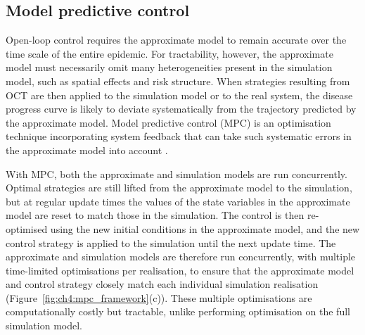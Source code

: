 \subsection{Model predictive control}

Open-loop control requires the approximate model to remain accurate over the time scale of the entire epidemic. For tractability, however, the approximate model must necessarily omit many heterogeneities present in the simulation model, such as spatial effects and risk structure. When strategies resulting from OCT are then applied to the simulation model or to the real system, the disease progress curve is likely to deviate systematically from the trajectory predicted by the approximate model. Model predictive control (MPC) is an optimisation technique incorporating system feedback that can take such systematic errors in the approximate model into account \citep{camacho_model_1995, lee_model_2011}.

With MPC, both the approximate and simulation models are run concurrently. Optimal strategies are still lifted from the approximate model to the simulation, but at regular update times the values of the state variables in the approximate model are reset to match those in the simulation. The control is then re-optimised using the new initial conditions in the approximate model, and the new control strategy is applied to the simulation until the next update time. The approximate and simulation models are therefore run concurrently, with multiple time-limited optimisations per realisation, to ensure that the approximate model and control strategy closely match each individual simulation realisation (Figure~\ref{fig:ch4:mpc_framework}(c)). These multiple optimisations are computationally costly but tractable, unlike performing optimisation on the full simulation model.

